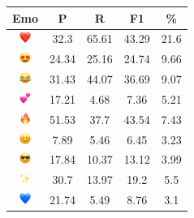 \documentclass{article}
\begin{document}
\begin{table}
\centering
\begin{tabular}{|c|ccc|c|} \hline
\textbf{Emo} & \textbf{P} & \textbf{R} & \textbf{F1} & \textbf{\%} \\ \hline
\includegraphics[height=0.37cm,width=0.37cm]{img/red_heart.png} & 32.3 & 65.61 & 43.29 & 21.6\\ 
\includegraphics[height=0.37cm,width=0.37cm]{img/smiling_face_with_hearteyes.png} & 24.34 & 25.16 & 24.74 & 9.66\\ 
\includegraphics[height=0.37cm,width=0.37cm]{img/face_with_tears_of_joy.png} & 31.43 & 44.07 & 36.69 & 9.07\\ 
\includegraphics[height=0.37cm,width=0.37cm]{img/two_hearts.png} & 17.21 & 4.68 & 7.36 & 5.21\\ 
\includegraphics[height=0.37cm,width=0.37cm]{img/fire.png} & 51.53 & 37.7 & 43.54 & 7.43\\ 
\includegraphics[height=0.37cm,width=0.37cm]{img/smiling_face_with_smiling_eyes.png} & 7.89 & 5.46 & 6.45 & 3.23\\ 
\includegraphics[height=0.37cm,width=0.37cm]{img/smiling_face_with_sunglasses.png} & 17.84 & 10.37 & 13.12 & 3.99\\ 
\includegraphics[height=0.37cm,width=0.37cm]{img/sparkles.png} & 30.7 & 13.97 & 19.2 & 5.5\\ 
\includegraphics[height=0.37cm,width=0.37cm]{img/blue_heart.png} & 21.74 & 5.49 & 8.76 & 3.1\\ 

\end{tabular}
\end{table}
\end{document}
